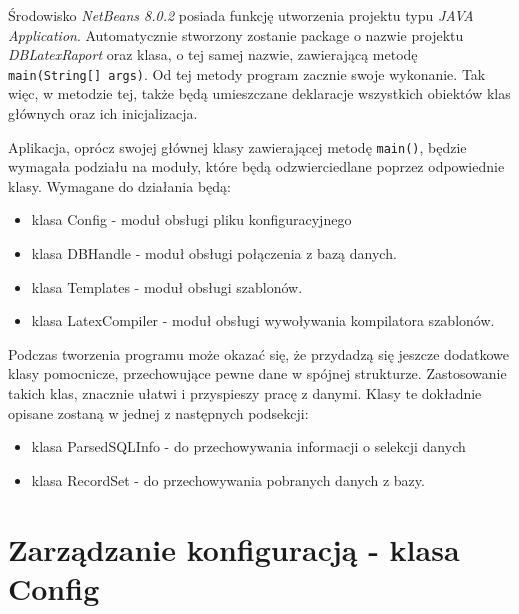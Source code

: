 Środowisko \emph{NetBeans 8.0.2} posiada funkcję utworzenia projektu typu \emph{JAVA Application}. Automatycznie stworzony zostanie package o nazwie projektu \emph{DBLatexRaport} oraz klasa, o tej samej nazwie, zawierającą metodę \texttt{main(String[] args)}. Od tej metody program zacznie swoje wykonanie. Tak więc, w metodzie tej, także będą umieszczane deklaracje wszystkich obiektów klas głównych oraz ich inicjalizacja. 
\par 
Aplikacja, oprócz swojej głównej klasy zawierającej metodę \texttt{main()}, będzie wymagała podziału na moduły, które będą odzwierciedlane poprzez odpowiednie klasy. Wymagane do działania będą:
\begin{itemize}
\item klasa Config - moduł obsługi pliku konfiguracyjnego 
\item klasa DBHandle - moduł obsługi połączenia z bazą danych.
\item klasa Templates - moduł obsługi szablonów.
\item klasa LatexCompiler -  moduł obsługi wywoływania kompilatora szablonów.
\end{itemize}
\vspace{5mm}
Podczas tworzenia programu może okazać się, że przydadzą się jeszcze dodatkowe klasy pomocnicze, przechowujące pewne dane w spójnej strukturze. Zastosowanie takich klas, znacznie ułatwi i przyspieszy pracę z danymi. Klasy te dokładnie opisane zostaną w jednej z następnych podsekcji:
\begin{itemize}
\item klasa ParsedSQLInfo - do przechowywania informacji o selekcji danych
\item klasa RecordSet - do przechowywania pobranych danych z bazy.
\end{itemize}

\section{Zarządzanie konfiguracją - klasa Config}

